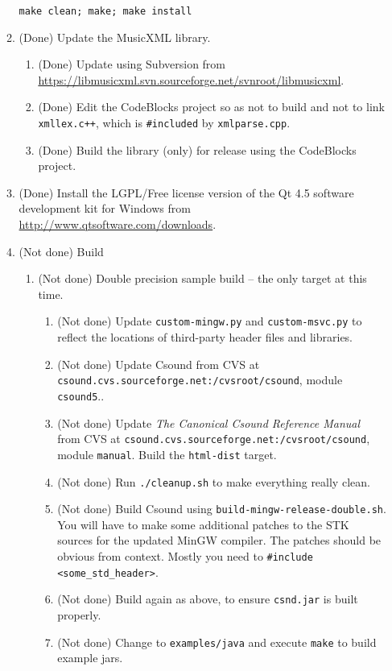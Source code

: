 \documentclass[11pt,letterpaper,onecolumn]{scrartcl}
\begin{document}
\begin{sloppypar}
\begin{enumerate}
\begin{enumerate}
\begin{lstlisting}
make clean; make; make install
\end{lstlisting}

			\item (Done) Update the MusicXML library.
			  \begin{enumerate}
			    \item (Done) Update using Subversion from \url{https://libmusicxml.svn.sourceforge.net/svnroot/libmusicxml}.
			    \item (Done) Edit the CodeBlocks project so as not to build and not to link \verb|xmllex.c++|, which is \verb|#included| by \verb|xmlparse.cpp|.
			    \item (Done) Build the library (only) for release using the CodeBlocks project.
			  \end{enumerate}

			\item (Done) Install the LGPL/Free license version of the Qt 4.5 software development kit for Windows from \url{http://www.qtsoftware.com/downloads}.
	\item (Not done) Build   
		\begin{enumerate}				
			\item (Not done) Double precision sample build -- the only target at this time.
				\begin{enumerate}
		    	\item (Not done) Update \texttt{custom-mingw.py} and \texttt{custom-msvc.py} to reflect the locations of third-party header files and libraries.
					\item (Not done) Update Csound from CVS at \verb|csound.cvs.sourceforge.net:/cvsroot/csound|, module \texttt{csound5}..
					\item (Not done) Update \emph{The Canonical Csound Reference Manual} from CVS at \verb|csound.cvs.sourceforge.net:/cvsroot/csound|, module \texttt{manual}. Build the \texttt{html-dist} target.
					\item (Not done) Run \texttt{./cleanup.sh} to make everything really clean.
			    \item (Not done) Build Csound using \texttt{build-mingw-release-double.sh}. You will have to make some additional patches to the STK sources for the updated MinGW compiler. The patches should be obvious from context. Mostly you need to \verb|#include <some_std_header>|.
			    \item (Not done) Build again as above, to ensure \texttt{csnd.jar} is built properly.
			    \item (Not done) Change to \texttt{examples/java} and execute \texttt{make} to build example jars.
			

\end{enumerate}
\end{enumerate}
\end{enumerate}
\end{enumerate}
\end{sloppypar}
\end{document}
